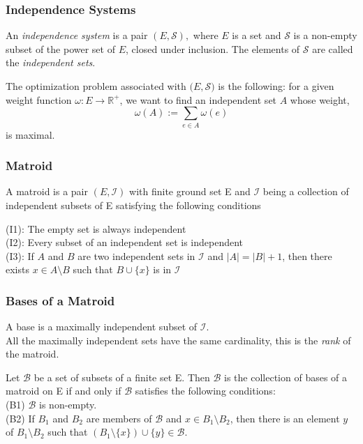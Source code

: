 \documentclass{beamer}
\begin{document}
\begin{frame}
\frametitle{Independence Systems}
\begin{definition}
An \textit{independence system} is a pair $(E,\mathcal{S}),$ where $E$ is a set and $\mathcal{S}$ is a non-empty subset of the power set of $E$, closed under inclusion. The elements of $\mathcal{S}$ are called the \textit{independent sets}.


The optimization problem associated with $(E,\mathcal{S)}$ is the following: for a given weight function $\omega : E \rightarrow \mathbb{R^{+}}$, we want to find an independent set $A$ whose weight,
\begin{equation}
\omega(A) := \sum_{e \in A} \omega (e)
\end{equation}
is maximal.
\end{definition}
\end{frame}

\begin{frame}
\frametitle{Matroid}
\begin{definition}
A matroid is a pair $(E,\mathcal{I})$ with finite ground set E and $\mathcal{I}$ being a collection of independent subsets of E satisfying the following conditions

\vspace{2mm}

 \noindent (I1): The empty set is always independent\\
 \noindent (I2): Every subset of an independent set is independent\\
 \noindent (I3): If $ A $ and $ B $ are two independent sets in $\mathcal{I}$ and $|A|=|B|+1$, then there exists $ x \in A \setminus B $ such that $ B \cup \{ x \} $ is in $\mathcal{I}$
\end{definition}

\end{frame}

\begin{frame}
\frametitle{Bases of a Matroid}
 
\begin{definition}
A base is a maximally independent subset of $\mathcal{I}.$\\
\noindent All the maximally independent sets have the same cardinality, this is the \textit{rank} of the matroid.
\end{definition}
\begin{definition}
  Let $\mathcal{B}$ be a set of subsets of a finite set E. Then $\mathcal{B}$ is the collection of bases of a matroid on E if and only if $\mathcal{B}$ satisfies the following conditions:\\
 (B1) $\mathcal{B}$ is non-empty.\\
 (B2) If $B_1$ and $B_2$ are members of $\mathcal{B}$ and $x \in B_1 \setminus B_2$, then there is an element $y$ of $B_1 \setminus B_2$ such that $(B_1 \setminus \{x\}) \cup \{y\} \in \mathcal{B}$.
 \end{definition}
\end{frame}
\end{document}
